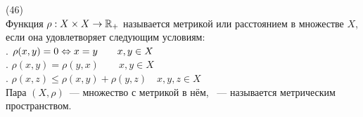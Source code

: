 (46)\\
Функция $\rho: X \times X \to \mathbb{R}_+$ называется метрикой или расстоянием в множестве $X$, если она удовлетворяет следующим условиям:\\
. $\rho(x, y) = 0 \Leftrightarrow x = y \qquad x, y \in X$\\
. $\rho(x, y) = \rho(y, x) \qquad x, y \in X$\\
. $\rho(x, z) \le \rho(x, y) + \rho(y, z) \quad x, y, z \in X$\\
Пара $(X, \rho)$~--- множество с метрикой в нём, ~--- называется  метрическим пространством.